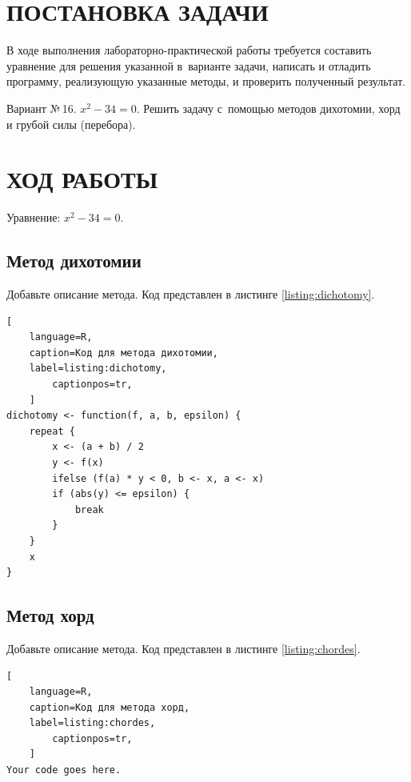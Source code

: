 \documentclass[14pt]{extarticle}
\begin{document}


\cfoot{\thepage}

\section{\MakeUppercase{Постановка задачи}}

В ходе выполнения лабораторно-практической работы требуется составить уравнение для решения указанной в~варианте задачи, написать и отладить программу, реализующую указанные методы, и проверить полученный результат.

Вариант №\,16. $x^2 - 34 = 0$. Решить задачу с~помощью методов дихотомии, хорд и грубой силы (перебора).

\newpage

\section{\MakeUppercase{Ход работы}}

Уравнение: $x^2 - 34 = 0$.


\vspace{1.5em}\subsection{Метод дихотомии}

Добавьте описание метода. Код представлен в листинге \ref{listing:dichotomy}.

\vspace{1.5em}
\begin{lstlisting}[
	language=R,
	caption=Код для метода дихотомии,
	label=listing:dichotomy,
        captionpos=tr,
	]
dichotomy <- function(f, a, b, epsilon) {
    repeat {
        x <- (a + b) / 2
        y <- f(x)
        ifelse (f(a) * y < 0, b <- x, a <- x)
        if (abs(y) <= epsilon) {
            break
        }
    }
    x
}
\end{lstlisting}


\subsection{Метод хорд}

Добавьте описание метода. Код представлен в листинге \ref{listing:chordes}.

\vspace{1.5em}
\begin{lstlisting}[
	language=R,
	caption=Код для метода хорд,
	label=listing:chordes,
        captionpos=tr,
	]
Your code goes here.
\end{lstlisting}
\end{document}
